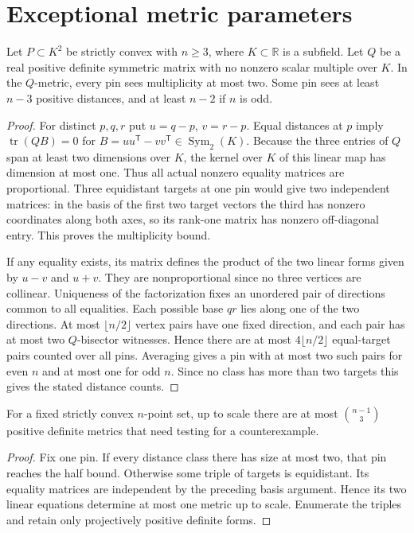 \section{Exceptional metric parameters}

\begin{theorem}[982-A02]
Let \(P\subset K^2\) be strictly convex with \(n\ge3\), where \(K\subset\mathbb R\) is a subfield. Let \(Q\) be a real positive definite symmetric matrix with no nonzero scalar multiple over \(K\). In the \(Q\)-metric, every pin sees multiplicity at most two. Some pin sees at least \(n-3\) positive distances, and at least \(n-2\) if \(n\) is odd.
\end{theorem}

\begin{proof}
For distinct \(p,q,r\) put \(u=q-p\), \(v=r-p\). Equal distances at \(p\) imply \(\operatorname{tr}(QB)=0\) for \(B=uu^{\mathsf T}-vv^{\mathsf T}\in\operatorname{Sym}_2(K)\). Because the three entries of \(Q\) span at least two dimensions over \(K\), the kernel over \(K\) of this linear map has dimension at most one. Thus all actual nonzero equality matrices are proportional. Three equidistant targets at one pin would give two independent matrices: in the basis of the first two target vectors the third has nonzero coordinates along both axes, so its rank-one matrix has nonzero off-diagonal entry. This proves the multiplicity bound.

If any equality exists, its matrix defines the product of the two linear forms given by \(u-v\) and \(u+v\). They are nonproportional since no three vertices are collinear. Uniqueness of the factorization fixes an unordered pair of directions common to all equalities. Each possible base \(qr\) lies along one of the two directions. At most \(\lfloor n/2\rfloor\) vertex pairs have one fixed direction, and each pair has at most two \(Q\)-bisector witnesses. Hence there are at most \(4\lfloor n/2\rfloor\) equal-target pairs counted over all pins. Averaging gives a pin with at most two such pairs for even \(n\) and at most one for odd \(n\). Since no class has more than two targets this gives the stated distance counts.
\end{proof}

\begin{corollary}[982-A06]
For a fixed strictly convex \(n\)-point set, up to scale there are at most
\(\binom{n-1}{3}\) positive definite metrics that need testing for a counterexample.
\end{corollary}
\begin{proof}
Fix one pin. If every distance class there has size at most two, that pin reaches
the half bound. Otherwise some triple of targets is equidistant. Its equality
matrices are independent by the preceding basis argument. Hence its two
linear equations determine at most one metric up to scale. Enumerate the
triples and retain only projectively positive definite forms.
\end{proof}


